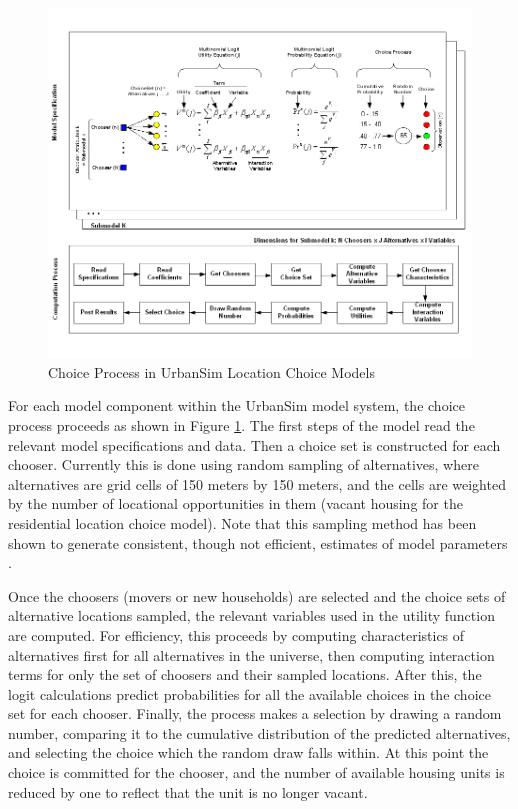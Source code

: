 \documentclass[12pt,a4paper]{article}
\begin{document}
\begin{figure}[h]
\center
 \includegraphics[width=6.5in]
 {ChoiceProcess.png}
\caption{Choice Process in UrbanSim Location Choice Models}
\label{fig:choiceprocess}
\end{figure}

For each model component within the UrbanSim model system, the
choice process proceeds as shown in Figure
\ref{fig:choiceprocess}. The first steps of the model read the
relevant model specifications and data.  Then a choice set is
constructed for each chooser.  Currently this is done using random
sampling of alternatives, where alternatives are grid cells of 150
meters by 150 meters, and the cells are weighted by the number of
locational opportunities in them (vacant housing for the
residential location choice model).  Note that this sampling
method has been shown to generate consistent, though not
efficient, estimates of model parameters
\cite{ben-akiva-lerman-1987}.

Once the choosers (movers or new households) are selected and the
choice sets of alternative locations sampled, the relevant
variables used in the utility function are computed.  For
efficiency, this proceeds by computing characteristics of
alternatives first for all alternatives in the universe, then
computing interaction terms for only the set of choosers and their
sampled locations.  After this, the logit calculations predict
probabilities for all the available choices in the choice set for
each chooser.  Finally, the process makes a selection by drawing a
random number, comparing it to the cumulative distribution of the
predicted alternatives, and selecting the choice which the random
draw falls within.  At this point the choice is committed for the
chooser, and the number of available housing units is reduced by
one to reflect that the unit is no longer vacant.
\end{document}
